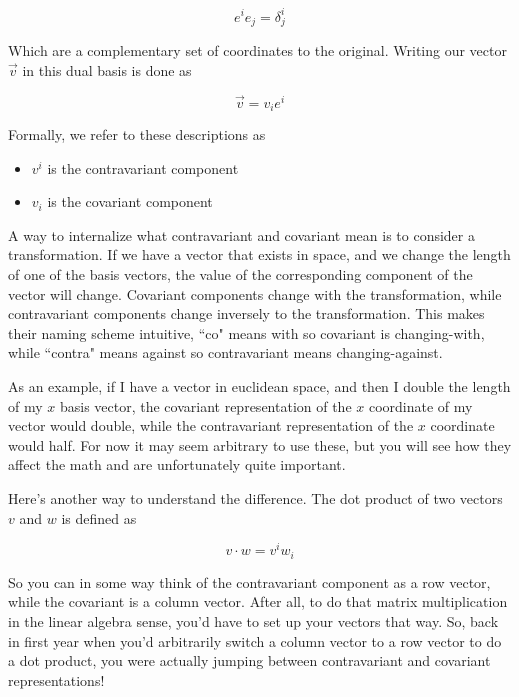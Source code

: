 \documentclass{article}
\begin{document}
\begin{equation}
    e^i e_j = \delta^i_j
\end{equation}

Which are a complementary set of coordinates to the original. Writing our vector $\vec{v}$ in this dual basis is done as

\begin{equation}
    \vec{v} = v_i e^i
\end{equation}

Formally, we refer to these descriptions as
\begin{itemize}
    \item $v^i$ is the contravariant component
    \item $v_i$ is the covariant component
\end{itemize}

A way to internalize what contravariant and covariant mean is to consider a transformation. If we have a vector that exists in space, and we change the length of one of the basis vectors, the value of the corresponding component of the vector will change. Covariant components change with the transformation, while contravariant components change inversely to the transformation. This makes their naming scheme intuitive, ``co" means with so covariant is changing-with, while ``contra" means against so contravariant means changing-against. 

As an example, if I have a vector in euclidean space, and then I double the length of my $x$ basis vector, the covariant representation of the $x$ coordinate of my vector would double, while the contravariant representation of the $x$ coordinate would half. For now it may seem arbitrary to use these, but you will see how they affect the math and are unfortunately quite important.

Here's another way to understand the difference. The dot product of two vectors $v$ and $w$ is defined as

\begin{equation}
    v \cdot w = v^i w_i
\end{equation}

So you can in some way think of the contravariant component as a row vector, while the covariant is a column vector. After all, to do that matrix multiplication in the linear algebra sense, you'd have to set up your vectors that way. So, back in first year when you'd arbitrarily switch a column vector to a row vector to do a dot product, you were actually jumping between contravariant and covariant representations!
\end{document}
